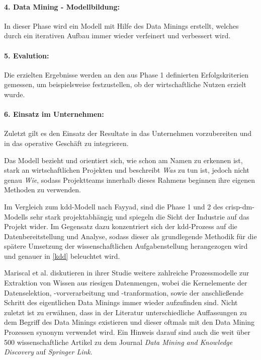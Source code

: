 \paragraph{4. Data Mining - Modellbildung:}
In dieser Phase wird ein Modell mit Hilfe des Data Minings erstellt, welches durch ein iterativen Aufbau immer wieder verfeinert und verbessert wird. 
\paragraph{5. Evalution:}
Die erzielten Ergebnisse werden an den aus Phase 1 definierten Erfolgskriterien gemessen, um beispielsweise festzustellen, ob der wirtschaftliche Nutzen erzielt wurde.
\paragraph{6. Einsatz im Unternehmen:}
Zuletzt gilt es den Einsatz der Resultate in das Unternehmen vorzubereiten und in das operative Geschäft zu integrieren.

Das Modell bezieht und orientiert sich, wie schon am Namen zu erkennen ist, stark an wirtschaftlichen Projekten und beschreibt \textit{Was} zu tun ist, jedoch nicht genau \textit{Wie}, sodass Projektteams innerhalb dieses Rahmens beginnen ihre eigenen Methoden zu verwenden.

Im Vergleich zum \gls{kdd}-Modell nach Fayyad, sind die Phase 1 und 2 des \gls{crisp-dm}-Modells sehr stark projektabhängig und spiegeln die Sicht der Industrie auf das Projekt wider. Im Gegensatz dazu konzentriert sich der \gls{kdd}-Prozess auf die Datenbereitstellung und Analyse, sodass dieser als grundlegende Methodik für die spätere Umsetzung der wissenschaftlichen Aufgabenstellung herangezogen wird und genauer in \vref{kdd} beleuchtet wird.

Mariscal et al. diskutieren in ihrer Studie weitere zahlreiche Prozessmodelle zur Extraktion von Wissen aus riesigen Datenmengen, wobei die Kernelemente der Datenselektion, -vorverarbeitung und -tranformation, sowie der anschließende Schritt des eigentlichen Data Minings immer wieder aufzufinden sind. Nicht zuletzt ist zu erwähnen, dass in der Literatur unterschiedliche Auffassungen zu dem Begriff des Data Minings existieren und dieser oftmals mit den Data Mining Prozessen synonym verwendet wird. Ein Hinweis darauf sind auch die weit über 500 wissenschaftliche Artikel zu dem Journal \textit{Data Mining and Knowledge Discovery} auf \textit{Springer Link}.

